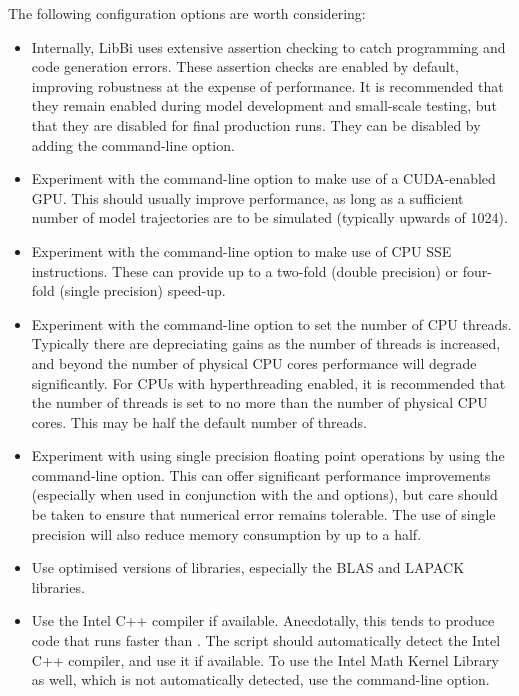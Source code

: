 The following configuration options are worth considering:
\begin{itemize}
\item Internally, LibBi uses extensive assertion checking to catch programming
  and code generation errors. These assertion
  checks are enabled by default, improving robustness at the expense of
  performance. It is recommended that they remain enabled during model
  development and small-scale testing, but that they are disabled for final
  production runs. They can be disabled by adding the 
  command-line option.

\item Experiment with the  command-line option to make use
  of a CUDA-enabled GPU. This should usually improve
  performance, as long as a sufficient number of model trajectories are to be
  simulated (typically upwards of 1024).

\item Experiment with the  command-line
  option to make use of CPU SSE instructions. These can
  provide up to a two-fold (double precision) or four-fold (single precision)
  speed-up.

\item {} Experiment with the
   command-line option to set the number of CPU
  threads. Typically there are depreciating gains as the number of threads is
  increased, and beyond the number of physical CPU cores performance will
  degrade significantly. For CPUs with hyperthreading enabled, it is
  recommended that the number of threads is set to no more than the number of
  physical CPU cores. This may be half the default number of threads.

\item Experiment with using single precision floating
  point operations by using the  command-line
  option. This can offer significant performance improvements (especially when
  used in conjunction with the  and 
  options), but care should be taken to ensure that numerical error remains
  tolerable. The use of single precision will also reduce memory consumption
  by up to a half.

\item Use optimised versions of libraries, especially the BLAS and
  LAPACK libraries.

\item Use the Intel C++ compiler if
  available. Anecdotally, this tends to produce code that runs faster than
  . The  script should automatically
  detect the Intel C++ compiler, and use it if available. To
  use the Intel Math Kernel Library as well, which is not automatically
  detected, use the  command-line option.

\end{itemize}

